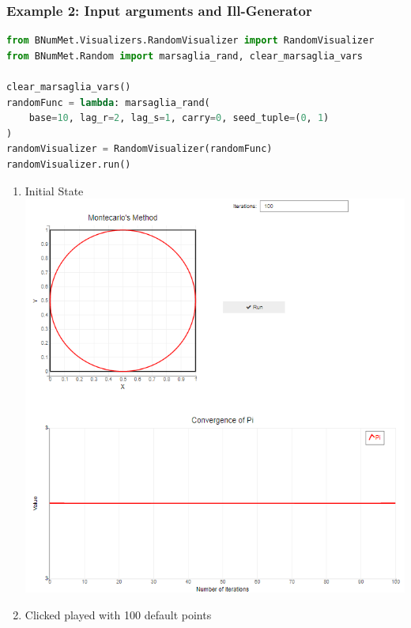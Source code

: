 \subsubsection{Example 2: Input arguments and Ill-Generator}
\begin{lstlisting}[language=Python]
from BNumMet.Visualizers.RandomVisualizer import RandomVisualizer
from BNumMet.Random import marsaglia_rand, clear_marsaglia_vars

clear_marsaglia_vars()
randomFunc = lambda: marsaglia_rand(
    base=10, lag_r=2, lag_s=1, carry=0, seed_tuple=(0, 1)
)
randomVisualizer = RandomVisualizer(randomFunc)
randomVisualizer.run()
\end{lstlisting}

\begin{enumerate}
    \item Initial State\\
    \includegraphics[scale=0.7]{Include/Images/Thesis/Documentation/Visualizers/Randomness/Example 2/Example 2 - 00 - Initial State.png}
    \item Clicked played with 100 default points\\

\end{enumerate}
